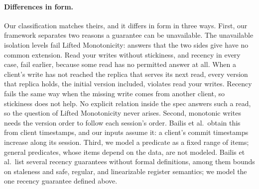 \paragraph{Differences in form.}
Our classification matches theirs, and it differs in form in three ways.
First, our framework separates two reasons a guarantee can be unavailable.
The unavailable isolation levels fail Lifted Monotonicity: answers that the two
sides give have no common extension.  Read your writes without stickiness, and
recency in every case, fail earlier, because some read has no permitted answer
at all.  When a client's write has not reached the replica that serves its next
read, every version that replica holds, the initial version included, violates
read your writes.  Recency fails the same way when the missing write comes from
another client, so stickiness does not help.  No explicit relation inside the
spec answers such a read, so the question of Lifted Monotonicity never arises.
Second, monotonic writes needs the version order to follow each session's
order.  Bailis et al.\ obtain this from client timestamps, and our inputs
assume it: a client's commit timestamps increase along its session.  Third, we
model a predicate as a fixed range of items; general predicates, whose items
depend on the data, are not modeled.  Bailis et al.\ list several recency
guarantees without formal definitions, among them bounds on staleness and safe,
regular, and linearizable register semantics; we model the one recency
guarantee defined above.

